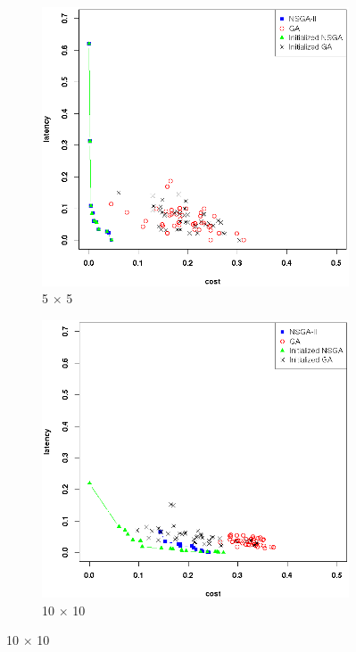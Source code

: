 \documentclass{llncs}
\begin{document}
\begin{figure}[H]
\begin{subfigure}[b]{0.45\textwidth}
		\includegraphics[width=\textwidth]{pics/pop_50_gen_50_5_times_5_sufficient_initialisation.png}
		\caption{5 $\times$ 5}
	\end{subfigure}
	\begin{subfigure}[b]{0.45\textwidth}
		\includegraphics[width=\textwidth]{pics/pop_50_gen_50_10_times_10_sufficient_initialisation.png}
		\caption{10 $\times$ 10}

\end{subfigure}
\end{figure}
\end{document}

